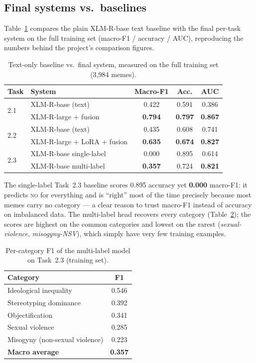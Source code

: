 \documentclass[11pt,a4paper]{article}
\begin{document}
\subsection{Final systems vs.\ baselines}
Table~\ref{tab:bvf} compares the plain XLM-R-base text baseline with the final per-task system on
the full training set (macro-F1 / accuracy / AUC), reproducing the numbers behind the project's
comparison figures.

\begin{table}[H]
\centering
\small
\caption{Text-only baseline vs.\ final system, measured on the full training set (3{,}984 memes).}
\label{tab:bvf}
\begin{tabular}{llccc}
\toprule
Task & System & Macro-F1 & Acc. & AUC \\
\midrule
\multirow{2}{*}{2.1} & XLM-R-base (text)        & 0.422 & 0.591 & 0.386 \\
                     & XLM-R-large + fusion     & \textbf{0.794} & \textbf{0.797} & \textbf{0.867} \\
\midrule
\multirow{2}{*}{2.2} & XLM-R-base (text)        & 0.435 & 0.608 & 0.741 \\
                     & XLM-R-large + LoRA + fusion & \textbf{0.635} & \textbf{0.674} & \textbf{0.827} \\
\midrule
\multirow{2}{*}{2.3} & XLM-R-base single-label  & 0.000 & 0.895 & 0.614 \\
                     & XLM-R-base multi-label   & \textbf{0.357} & 0.724 & \textbf{0.821} \\
\bottomrule
\end{tabular}
\end{table}

The single-label Task~2.3 baseline scores 0.895 accuracy yet \textbf{0.000} macro-F1: it predicts
\textsc{no} for everything and is ``right'' most of the time precisely because most memes carry no
category --- a clear reason to trust macro-F1 instead of accuracy on imbalanced data. The multi-label
head recovers every category (Table~\ref{tab:cat}); the scores are highest on the common categories
and lowest on the rarest (\emph{sexual-violence}, \emph{misogyny-NSV}), which simply have very few
training examples.

\begin{table}[H]
\centering
\small
\caption{Per-category F1 of the multi-label model on Task~2.3 (training set).}
\label{tab:cat}
\begin{tabular}{lc}
\toprule
Category & F1 \\
\midrule
Ideological inequality        & 0.546 \\
Stereotyping dominance        & 0.392 \\
Objectification               & 0.341 \\
Sexual violence               & 0.285 \\
Misogyny (non-sexual violence)& 0.223 \\
\midrule
\textbf{Macro average}        & \textbf{0.357} \\
\bottomrule
\end{tabular}
\end{table}
\end{document}
